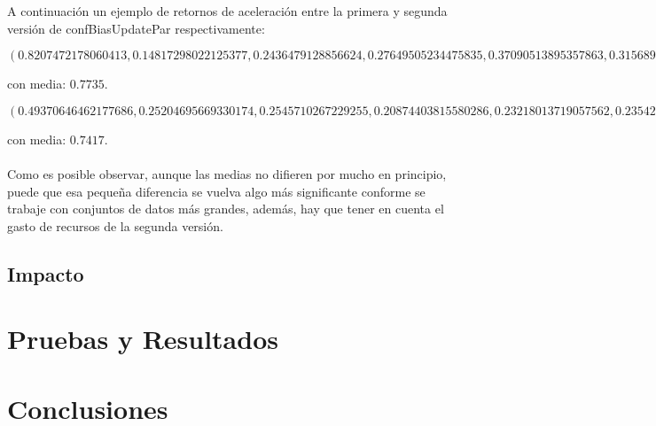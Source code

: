 \documentclass{article}
\begin{document}
    A continuación un ejemplo de retornos de aceleración entre la primera y segunda versión de confBiasUpdatePar respectivamente:

    \[(0.8207472178060413, 0.14817298022125377, 0.2436479128856624, 0.27649505234475835, 0.37090513895357863, 0.3156890796375775, 0.43145311916324236, 0.29075274177467597, 0.359843417075467, 0.927856261143876, 1.333425567238517, 1.2416312895817385, 2.259662102473498, 1.809371031348172)\]

    con media: $0.7735$.

    \[(0.49370646462177686, 0.25204695669330174, 0.2545710267229255, 0.20874403815580286, 0.23218013719057562, 0.23542445644647558, 0.2920592193808883, 0.3730704569769219, 0.47244897959183674, 0.6780619111709287, 1.13201517874975, 1.8333333333333335, 1.2628692816915323, 2.6636148094109067)\]

    con media: $0.7417$.
    \\
    \\
    Como es posible observar, aunque las medias no difieren por mucho en principio, puede que esa pequeña diferencia se vuelva algo más significante conforme se trabaje con conjuntos de datos más grandes, además, hay que tener en cuenta el gasto de recursos de la segunda versión.

    \subsection{Impacto}

  \section{Pruebas y Resultados}

  \section{Conclusiones}
\end{document}
